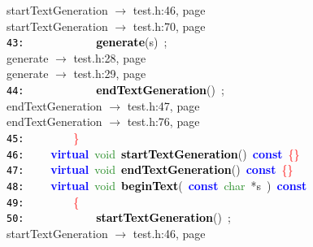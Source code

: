 \documentclass{article}
\begin{document}
\mbox{}{\hfill startTextGeneration $\rightarrow$ test.h:46, page~\pageref{test.h:46}} \\
\mbox{}{\hfill startTextGeneration $\rightarrow$ test.h:70, page~\pageref{test.h:70}} \\
\mbox{}\texttt{\textcolor{Black}{43:}} \ \ \ \ \ \ \ \ \ \ \ \ \textbf{\textcolor{Black}{generate}}\textcolor{BrickRed}{(}s\textcolor{BrickRed}{)}\ \textcolor{BrickRed}{;} \\
\mbox{}{\hfill generate $\rightarrow$ test.h:28, page~\pageref{test.h:28}} \\
\mbox{}{\hfill generate $\rightarrow$ test.h:29, page~\pageref{test.h:29}} \\
\mbox{}\texttt{\textcolor{Black}{44:}} \ \ \ \ \ \ \ \ \ \ \ \ \textbf{\textcolor{Black}{endTextGeneration}}\textcolor{BrickRed}{()}\ \textcolor{BrickRed}{;} \\
\mbox{}{\hfill endTextGeneration $\rightarrow$ test.h:47, page~\pageref{test.h:47}} \\
\mbox{}{\hfill endTextGeneration $\rightarrow$ test.h:76, page~\pageref{test.h:76}} \\
\mbox{}\texttt{\textcolor{Black}{45:}} \ \ \ \ \ \ \ \ \textcolor{Red}{\}} \\
\mbox{}\texttt{\textcolor{Black}{46:}} \ \ \ \ \textbf{\textcolor{Blue}{virtual}}\ \textcolor{ForestGreen}{void}\ \textbf{\textcolor{Black}{\label{test.h:46}startTextGeneration}}\textcolor{BrickRed}{()}\ \textbf{\textcolor{Blue}{const}}\ \textcolor{Red}{\{\}} \\
\mbox{}\texttt{\textcolor{Black}{47:}} \ \ \ \ \textbf{\textcolor{Blue}{virtual}}\ \textcolor{ForestGreen}{void}\ \textbf{\textcolor{Black}{\label{test.h:47}endTextGeneration}}\textcolor{BrickRed}{()}\ \textbf{\textcolor{Blue}{const}}\ \textcolor{Red}{\{\}} \\
\mbox{}\texttt{\textcolor{Black}{48:}} \ \ \ \ \textbf{\textcolor{Blue}{virtual}}\ \textcolor{ForestGreen}{void}\ \textbf{\textcolor{Black}{\label{test.h:48}beginText}}\textcolor{BrickRed}{(}\ \textbf{\textcolor{Blue}{const}}\ \textcolor{ForestGreen}{char}\ \textcolor{BrickRed}{*}s\ \textcolor{BrickRed}{)}\ \textbf{\textcolor{Blue}{const}} \\
\mbox{}\texttt{\textcolor{Black}{49:}} \ \ \ \ \ \ \ \ \textcolor{Red}{\{} \\
\mbox{}\texttt{\textcolor{Black}{50:}} \ \ \ \ \ \ \ \ \ \ \ \ \textbf{\textcolor{Black}{startTextGeneration}}\textcolor{BrickRed}{()}\ \textcolor{BrickRed}{;} \\
\mbox{}{\hfill startTextGeneration $\rightarrow$ test.h:46, page~\pageref{test.h:46}} \\
\end{document}
